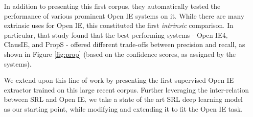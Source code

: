 In addition to presenting this first corpus, they automatically tested the performance of various prominent
Open IE systems on it. While there are many extrinsic uses for Open IE, this
constituted the first \emph{intrinsic} comparison.
In particular, that study found that the best performing systems - Open IE4, ClausIE, and PropS - 
offered different trade-offs between precision and recall, as shown in Figure \ref{fig:prop} (based on the confidence scores, as assigned by the systems).

We extend upon this line of work by presenting the first
supervised Open IE extractor trained on
this large recent corpus.
Further leveraging the inter-relation between SRL and Open IE, we take  a state of the art SRL deep learning model as our starting point,
while modifying and extending it to fit the Open IE task.





